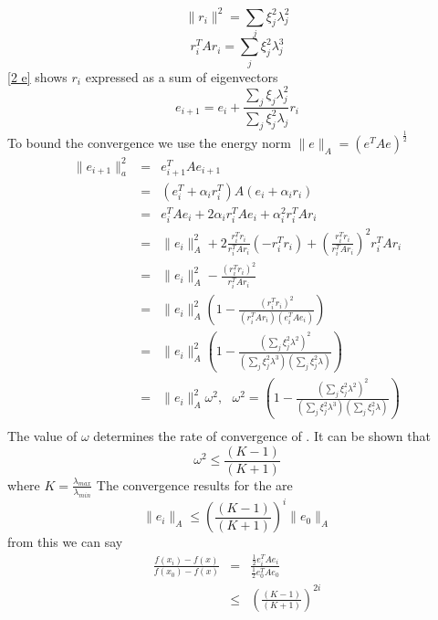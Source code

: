 \begin{equation}
\lVert r_i\rVert ^2 = \sum_j \xi_j^2 \lambda_j^2
\end{equation}
\begin{equation}
r_i^TAr_i = \sum_j \xi_j^2 \lambda_j^3
\end{equation}
\ref{2 e} shows $r_i$ expressed as a sum of eigenvectors
\begin{equation}
e_{i+1} = e_{i} +\frac{\sum_j\xi_j\lambda_j^2}{\sum_j \xi_j^2 \lambda_j}r_i
\end{equation}
To bound the convergence we use the energy norm $\lVert e\rVert_A=(e^TAe)^{\frac{1}{2}}$
\begin{eqnarray*}
\lVert e_{i+1}\rVert ^2_a &= &e_{i+1}^TAe_{i+1}\\
&=&(e_i^T+\alpha_ir_i^T)A(e_i + \alpha_i r_i)\\
&=& e_i^TAe_i+2 \alpha_i r_i^TAe_i + \alpha^2_i r_i^T A r_i \\
& = & \lVert e_i\rVert ^2_A+2\frac{r_i^Tr_i}{r_i^TAr_i}(-r_i^Tr_i)+\left(\frac{r_i^Tr_i}{r_i^TAr_i}\right)^2r_i^TAr_i\\
&=&\lVert e_i\rVert_A^2-\frac{(r_i^Tr_i)^2}{r_i^TAr_i}\\
&=&\lVert e_i\rVert_A^2\left( 1-\frac{(r_i^Tr_i)^2}{(r_i^TAr_i)(e_i^TAe_i)}\right)\\
&=&\lVert e_i\rVert_A^2\left( 1-\frac{(\sum_{j}\xi_{j}^2\lambda^2)^2}{(\sum_j \xi_{j}^2\lambda^3 )( \sum_{j}\xi_{j}^2\lambda  )}\right)\\
&=&\lVert e_i\rVert_A^2\omega^2, \ \ \ \omega^2=\left( 1-\frac{(\sum_{j}\xi_{j}^2\lambda^2)^2}{(\sum_j \xi_{j}^2\lambda^3 )( \sum_{j}\xi_{j}^2\lambda  )}\right)\\
\end{eqnarray*}
The value of $\omega$ determines the rate of convergence of . 
It can be shown that 
\[ \omega^2 \leq \frac{(K-1)}{(K+1)} \]
where $K=\frac{\lambda_{max}}{\lambda_{min}}$
The convergence results for the  are 
\[\lVert e_i\rVert_A\leq\left(\frac{(K-1)}{(K+1)}\right)^i\lVert e_0\rVert_A \]
from this we can say
\begin{eqnarray*}
 \frac{f(x_i)-f(x)}{f(x_0)-f(x)} &=& \frac{\frac{1}{2}e_i^TAe_i}{\frac{1}{2}e_0^TAe_0}\\
&\leq  &\left(\frac{(K-1)}{(K+1)}\right)^{2i}
\end{eqnarray*}
